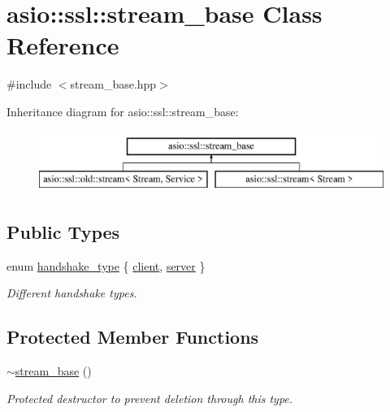 \hypertarget{classasio_1_1ssl_1_1stream__base}{}\section{asio\+:\+:ssl\+:\+:stream\+\_\+base Class Reference}
\label{classasio_1_1ssl_1_1stream__base}


{\ttfamily \#include $<$stream\+\_\+base.\+hpp$>$}

Inheritance diagram for asio\+:\+:ssl\+:\+:stream\+\_\+base\+:\begin{figure}[H]
\begin{center}
\leavevmode
\includegraphics[height=2.000000cm]{classasio_1_1ssl_1_1stream__base}
\end{center}
\end{figure}
\subsection*{Public Types}
\begin{DoxyCompactItemize}
\item 
enum \hyperlink{classasio_1_1ssl_1_1stream__base_a2f18813d3860bc8aee99249834d7c320}{handshake\+\_\+type} \{ \hyperlink{classasio_1_1ssl_1_1stream__base_a2f18813d3860bc8aee99249834d7c320a68134fb041cb11ffe46e248ed1e1d73f}{client}, 
\hyperlink{classasio_1_1ssl_1_1stream__base_a2f18813d3860bc8aee99249834d7c320a2f9bac13b8adb5945e7436945061d090}{server}
 \}\begin{DoxyCompactList}\small\item\em Different handshake types. \end{DoxyCompactList}
\end{DoxyCompactItemize}
\subsection*{Protected Member Functions}
\begin{DoxyCompactItemize}
\item 
\hyperlink{classasio_1_1ssl_1_1stream__base_af44f60fc18949a1235701c7ab76848b8}{$\sim$stream\+\_\+base} ()
\begin{DoxyCompactList}\small\item\em Protected destructor to prevent deletion through this type. \end{DoxyCompactList}\end{DoxyCompactItemize}


